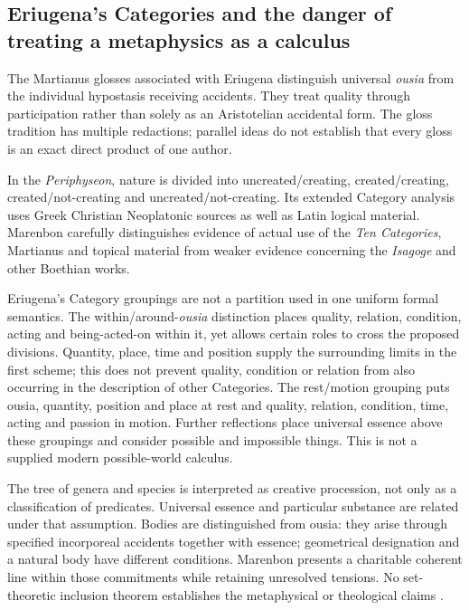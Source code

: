\subsection{Eriugena's Categories and the danger of treating a metaphysics as a calculus}

The Martianus glosses associated with Eriugena distinguish universal
\emph{ousia} from the individual hypostasis receiving accidents.
They treat quality through participation rather than solely as an
Aristotelian accidental form. The gloss tradition has multiple
redactions; parallel ideas do not establish that every gloss is
an exact direct product of one author.

In the \emph{Periphyseon}, nature is divided into uncreated/creating,
created/creating, created/not-creating and uncreated/not-creating.
Its extended Category analysis uses Greek Christian Neoplatonic
sources as well as Latin logical material.
Marenbon carefully distinguishes evidence of actual use of the
\emph{Ten Categories}, Martianus and topical material from weaker
evidence concerning the \emph{Isagoge} and other Boethian works.

Eriugena's Category groupings are not a partition used in one uniform
formal semantics. The within/around-\emph{ousia} distinction places
quality, relation, condition, acting and being-acted-on within it,
yet allows certain roles to cross the proposed divisions.
Quantity, place, time and position supply the surrounding limits
in the first scheme; this does not prevent quality, condition or
relation from also occurring in the description of other Categories.
The rest/motion grouping puts ousia, quantity, position and place
at rest and quality, relation, condition, time, acting and passion
in motion. Further reflections place universal essence above these
groupings and consider possible and impossible things.
This is not a supplied modern possible-world calculus.

The tree of genera and species is interpreted as creative procession,
not only as a classification of predicates. Universal essence and
particular substance are related under that assumption.
Bodies are distinguished from ousia: they arise through specified
incorporeal accidents together with essence; geometrical designation
and a natural body have different conditions.
Marenbon presents a charitable coherent line within those commitments
while retaining unresolved tensions. No set-theoretic inclusion
theorem establishes the metaphysical or theological claims
\cite[pp.~27--34]{Marenbon2007FordhamEarlyLatin}.

